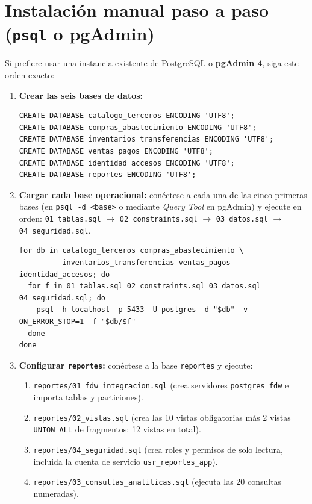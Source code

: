 \documentclass[11pt,oneside]{article}
\begin{document}
\section{Instalaci\'on manual paso a paso (\texttt{psql} o pgAdmin)}

Si prefiere usar una instancia existente de PostgreSQL o \textbf{pgAdmin 4},
siga este orden exacto:

\begin{enumerate}[leftmargin=1.5em, itemsep=4pt]
  \item \textbf{Crear las seis bases de datos:}
\begin{verbatim}
CREATE DATABASE catalogo_terceros ENCODING 'UTF8';
CREATE DATABASE compras_abastecimiento ENCODING 'UTF8';
CREATE DATABASE inventarios_transferencias ENCODING 'UTF8';
CREATE DATABASE ventas_pagos ENCODING 'UTF8';
CREATE DATABASE identidad_accesos ENCODING 'UTF8';
CREATE DATABASE reportes ENCODING 'UTF8';
\end{verbatim}

  \item \textbf{Cargar cada base operacional:} con\'ectese a cada una de las
        cinco primeras bases (en \texttt{psql -d <base>} o mediante \textit{Query
        Tool} en pgAdmin) y ejecute en orden:
        \texttt{01\_tablas.sql} $\to$ \texttt{02\_constraints.sql} $\to$
        \texttt{03\_datos.sql} $\to$ \texttt{04\_seguridad.sql}.
        \begin{verbatim}
for db in catalogo_terceros compras_abastecimiento \
          inventarios_transferencias ventas_pagos identidad_accesos; do
  for f in 01_tablas.sql 02_constraints.sql 03_datos.sql 04_seguridad.sql; do
    psql -h localhost -p 5433 -U postgres -d "$db" -v ON_ERROR_STOP=1 -f "$db/$f"
  done
done
        \end{verbatim}

  \item \textbf{Configurar \texttt{reportes}:} con\'ectese a la base
        \texttt{reportes} y ejecute:
        \begin{enumerate}[label=\alph*)]
          \item \texttt{reportes/01\_fdw\_integracion.sql} (crea servidores
                \texttt{postgres\_fdw} e importa tablas y particiones).
          \item \texttt{reportes/02\_vistas.sql} (crea las 10 vistas
                obligatorias m\'as 2 vistas \texttt{UNION ALL} de fragmentos:
                12 vistas en total).
          \item \texttt{reportes/04\_seguridad.sql} (crea roles y permisos de
                solo lectura, incluida la cuenta de servicio \texttt{usr\_reportes\_app}).
          \item \texttt{reportes/03\_consultas\_analiticas.sql} (ejecuta las
                20 consultas numeradas).
        \end{enumerate}
\end{enumerate}
\end{document}
